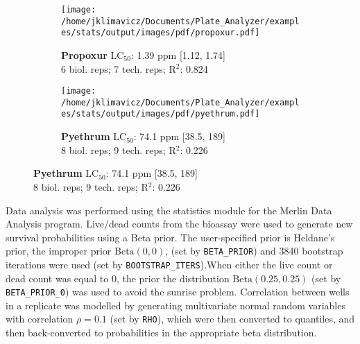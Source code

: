 \documentclass{article}
\begin{document}
\begin{figure}[thp!]
\begin{subfigure}{0.500\textwidth}
      \texttt{[image: /home/jklimavicz/Documents/Plate\_Analyzer/examples/stats/output/images/pdf/propoxur.pdf]}
      \vspace{-0.05cm}
      \caption*{\textbf{Propoxur} LC$_{50}$: 1.39 ppm [1.12, 1.74] \\ 
6 biol. reps; 7 tech. reps; R$^2$: 0.824}
      \vspace{0.1cm}
   \end{subfigure}%
   \begin{subfigure}{0.500\textwidth}
      \centering
      \texttt{[image: /home/jklimavicz/Documents/Plate\_Analyzer/examples/stats/output/images/pdf/pyethrum.pdf]}
      \vspace{-0.05cm}
      \caption*{\textbf{Pyethrum} LC$_{50}$: 74.1 ppm [38.5, 189] \\ 
8 biol. reps; 9 tech. reps; R$^2$: 0.226}
      \vspace{0.1cm}
   \end{subfigure}%
\end{figure}
\clearpage
\pagebreak
\vspace{-0.1cm}
\pagebreak


Data analysis was performed using the statistics module for the Merlin Data Analysis program. 
Live/dead counts from the bioassay were used to generate new survival probabilities using a Beta prior. The user-specified prior is Heldane's prior, the improper prior $\text{Beta}(0,0)$, (set by \texttt{BETA\_PRIOR}) and 3840 bootstrap iterations were used (set by \texttt{BOOTSTRAP\_ITERS}).When either the live count or dead count was equal to 0, the prior the distribution $\text{Beta}(0.25,0.25)$ (set by \texttt{BETA\_PRIOR\_0}) was used to avoid the sunrise problem. Correlation between wells in a replicate was modelled by generating multivariate normal random variables with correlation $\rho = 0.1$ (set by \texttt{RHO}),  which were then converted to quantiles, and then back-converted to probabilities in the appropriate beta distribution. 
\end{document}

